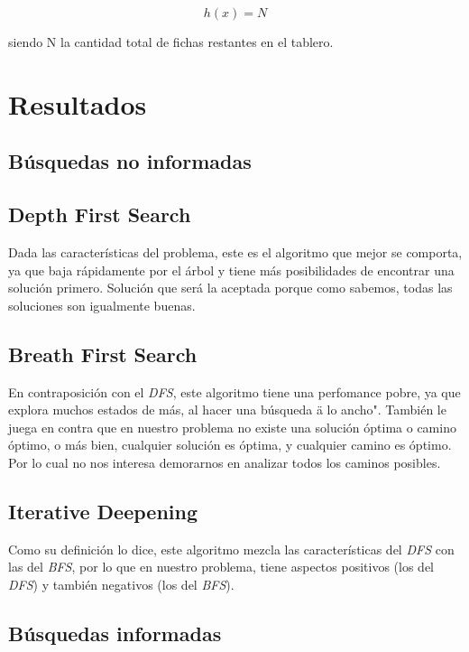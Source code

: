 \documentclass[a4paper,10pt]{article}
\begin{document}
    \[ h(x) = N \] 

    siendo N la cantidad total de fichas restantes en el tablero.

\section{Resultados}


\subsection{Búsquedas no informadas}

    \subsection{Depth First Search}
    Dada las características del problema, este es el algoritmo que mejor se comporta, ya que baja rápidamente por el árbol y tiene más posibilidades de encontrar una solución primero.
    Solución que será la aceptada porque como sabemos, todas las soluciones son igualmente buenas.
    
    \subsection{Breath First Search}
    En contraposición con el \textit{DFS}, este algoritmo tiene una perfomance pobre, ya que explora muchos estados de más, al hacer una búsqueda \"a lo ancho". También le juega en 
    contra que en nuestro problema no existe una solución óptima o camino óptimo, o más bien, cualquier solución es óptima, y cualquier camino es óptimo. Por lo cual no nos interesa 
    demorarnos en analizar todos los caminos posibles.
    
    \subsection{Iterative Deepening}
    Como su definición lo dice, este algoritmo mezcla las características del \textit{DFS} con las del \textit{BFS}, por lo que en nuestro problema, tiene aspectos positivos (los del 
    \textit{DFS}) y también negativos (los del \textit{BFS}). 
 
\subsection{Búsquedas informadas}
    
\end{document}
